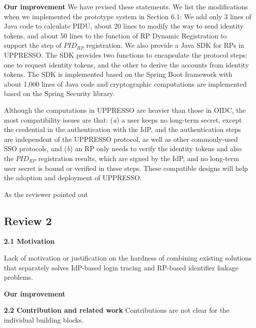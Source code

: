 \documentclass[letterpaper,onecolumn,10pt]{article}
\begin{document}

\vspace{1mm}\noindent\textbf{Our improvement}
We have revised these statements. We list the modifications when we implemented the prototype system in Section 6.1:
We add only 3 lines of Java code to calculate PIDU, about 20 lines to modify the way to send identity tokens,
 and about 50 lines to the function of RP Dynamic Registration to support the step of $PID_{RP}$ registration.
We also provide a Java SDK for RPs in UPPRESSO. 
The SDK provides two functions to encapsulate the protocol steps:
one to request identity tokens, and the other to derive the accounts from identity tokens.
 The SDK is implemented based on the Spring Boot framework with about 1,000 lines of Java code
  and cryptographic computations are implemented based on the Spring Security library.

Although the computations in UPPRESSO are heavier than those in OIDC,
    the most compatibility issues are that: (\emph{a}) a user keeps no long-term secret, except the credential in the authentication with the IdP,
        and the authentication steps are independent of the UPPRESSO protocol, as well as other commonly-used SSO protocols,
        and (\emph{b}) an RP only needs to verify the identity tokens and also the $PID_{RP}$ registration results, which are signed by the IdP,
                and no long-term user secret is bound or verified in these steps.
These compatible designs will help the adoption and deployment of UPPRESSO.

As the reviewer pointed out

\subsection*{Review 2}
\noindent\textbf{2.1 Motivation}

Lack of motivation or justification on the hardness of combining existing solutions that separately solves IdP-based login tracing and RP-based identifier linkage problems.

\vspace{1mm}\noindent\textbf{Our improvement}

\vspace{1mm}\noindent\textbf{2.2 Contribution and related work}
Contributions are not clear for the individual building blocks.
\end{document}
